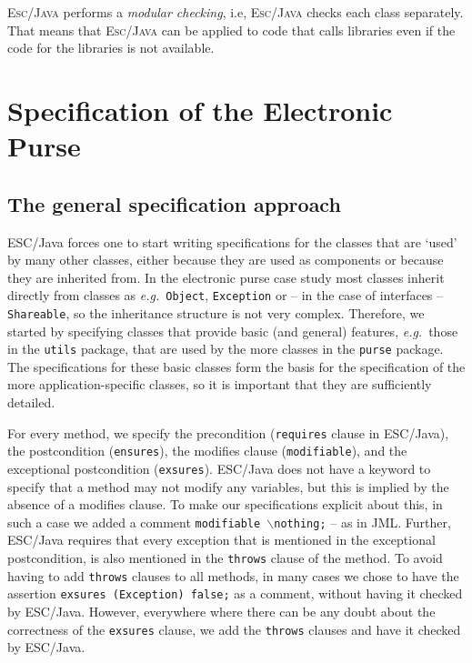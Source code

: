 \documentclass[a4paper]{llncs}
\newcommand{\noth}{\(\backslash\)\texttt{nothing}}
\begin{document}
\textsc{Esc/Java} performs a \textit{modular checking}, i.e,
\textsc{Esc/Java} checks each class separately. That means that
\textsc{Esc/Java} can be applied to code that calls libraries even if
the code for the libraries is not available. 






\section{Specification of the Electronic Purse}
\label{SectSpecPurse}






\subsection{The general specification approach}
ESC/Java forces one to start writing specifications for the classes
that are `used' by many other classes, either because they are used as 
components or because they are inherited from. In the electronic purse 
case study most classes inherit directly from classes as
\emph{e.g.}~\texttt{Object}, \texttt{Exception} or -- in the case of
interfaces -- \texttt{Shareable}, so the inheritance structure is not
very complex. Therefore, we started by specifying classes that
provide basic (and general) features, \emph{e.g.}~those in the
\texttt{utils} package,
that are used by the more classes in the \texttt{purse} package. The
specifications for these basic classes form the basis for the
specification of the more application-specific classes, so it is
important that they are sufficiently detailed.

For every method, we specify the precondition (\texttt{requires} clause
in ESC/Java), the postcondition (\texttt{ensures}), the modifies
clause (\texttt{modifiable}), and the exceptional postcondition
(\texttt{exsures}). ESC/Java does not have a keyword to specify that a
method may not modify any variables, but this is implied by the
absence of a modifies clause. To make our specifications explicit
about this, in such a case we added a comment
\texttt{modifiable \noth;} -- as in JML. Further, ESC/Java requires 
that every exception that is mentioned in the exceptional
postcondition, is also mentioned in the \texttt{throws} clause of the
method. To avoid having to add \texttt{throws} clauses to all methods,
in many cases we chose to have the assertion \texttt{exsures
(Exception) false;} as a comment, without having it checked by
ESC/Java. However, everywhere where there can be any doubt about the
correctness of the \texttt{exsures} clause, we add the \texttt{throws}
clauses and have it checked by ESC/Java.
\end{document}
